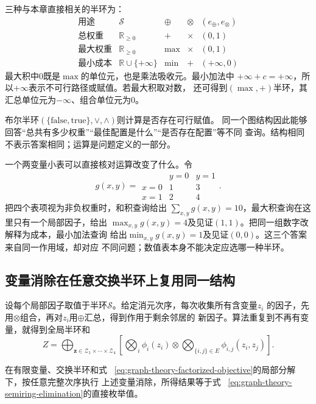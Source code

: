 三种与本章直接相关的半环为：
\[
\begin{array}{c|c|c|c|c}
  \text{用途}&\mathcal{S}&\oplus&\otimes&(e_{\oplus},e_{\otimes})\\
  \hline
  \text{总权重}&\mathbb{R}_{\geq0}&+&\times&(0,1)\\
  \text{最大权重}&\mathbb{R}_{\geq0}&\max&\times&(0,1)\\
  \text{最小成本}&\mathbb{R}\cup\{+\infty\}&\min&+&(+\infty,0)
\end{array}
\]
最大积中\(0\)既是\(\max\)的单位元，也是乘法吸收元。最小加法中
\(+\infty+c=+\infty\)，所以\(+\infty\)表示不可行路径或赋值。若最大积取对数，
还可得到\((\max,+)\)半环，其汇总单位元为\(-\infty\)、组合单位元为\(0\)。

布尔半环\((\{\mathrm{false},\mathrm{true}\},\lor,\land)\)则计算是否存在可行赋值。
同一个图结构因此能够回答“总共有多少权重”“最佳配置是什么”“是否存在配置”等不同
查询。结构相同不表示答案相同；运算是问题定义的一部分。

一个两变量小表可以直接核对运算改变了什么。令
\[
  g(x,y)=
  \begin{array}{c|cc}
    &y=0&y=1\\ \hline
    x=0&1&3\\
    x=1&2&4
  \end{array}.
\]
把四个表项视为非负权重时，和积查询给出
\(\sum_{x,y}g(x,y)=10\)，最大积查询在这里只有一个局部因子，给出
\(\max_{x,y}g(x,y)=4\)及见证\((1,1)\)。把同一组数字改解释为成本，最小加法查询
给出\(\min_{x,y}g(x,y)=1\)及见证\((0,0)\)。这三个答案来自同一作用域，却对应
不同问题；数值表本身不能决定应选哪一种半环。

\subsection{变量消除在任意交换半环上复用同一结构}

设每个局部因子取值于半环\(\mathcal{S}\)。给定消元次序，每次收集所有含变量\(z_i\)
的因子，先用\(\otimes\)组合，再对\(z_i\)用\(\oplus\)汇总，得到作用于剩余邻居的
新因子。算法重复到不再有变量，就得到全局半环和
\begin{equation}
  Z=\bigoplus_{\bm{z}\in\mathcal{Z}_1\times\cdots\times\mathcal{Z}_4}
  \left[
    \bigotimes_i\phi_i(z_i)
    \otimes
    \bigotimes_{\{i,j\}\in E}\phi_{i,j}(z_i,z_j)
  \right].
  \label{eq:graph-theory-semiring-elimination}
\end{equation}

\begin{theorem}[半环变量消除的正确性]
  \label{thm:graph-theory-semiring-elimination}
  在有限变量、交换半环和式
  ~\eqref{eq:graph-theory-factorized-objective}的局部分解下，按任意完整次序执行
  上述变量消除，所得结果等于式
  ~\eqref{eq:graph-theory-semiring-elimination}的直接枚举值。
\end{theorem}

